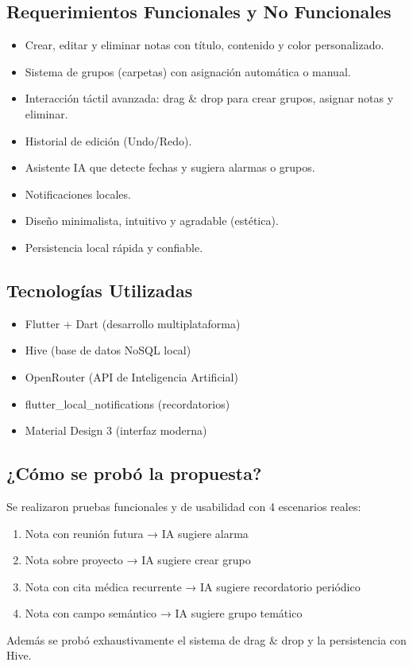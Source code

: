 \documentclass[12pt,a4paper]{article}
\begin{document}
\subsection{Requerimientos Funcionales y No Funcionales}
\begin{itemize}
    \item Crear, editar y eliminar notas con título, contenido y color personalizado.
    \item Sistema de grupos (carpetas) con asignación automática o manual.
    \item Interacción táctil avanzada: drag \& drop para crear grupos, asignar notas y eliminar.
    \item Historial de edición (Undo/Redo).
    \item Asistente IA que detecte fechas y sugiera alarmas o grupos.
    \item Notificaciones locales.
    \item Diseño minimalista, intuitivo y agradable (estética).
    \item Persistencia local rápida y confiable.
\end{itemize}

\subsection{Tecnologías Utilizadas}
\begin{itemize}
    \item Flutter + Dart (desarrollo multiplataforma)
    \item Hive (base de datos NoSQL local)
    \item OpenRouter (API de Inteligencia Artificial)
    \item flutter\_local\_notifications (recordatorios)
    \item Material Design 3 (interfaz moderna)
\end{itemize}

\subsection{¿Cómo se probó la propuesta?}
Se realizaron pruebas funcionales y de usabilidad con 4 escenarios reales:
\begin{enumerate}
    \item Nota con reunión futura → IA sugiere alarma
    \item Nota sobre proyecto → IA sugiere crear grupo
    \item Nota con cita médica recurrente → IA sugiere recordatorio periódico
    \item Nota con campo semántico → IA sugiere grupo temático
\end{enumerate}
Además se probó exhaustivamente el sistema de drag \& drop y la persistencia con Hive.
\end{document}
